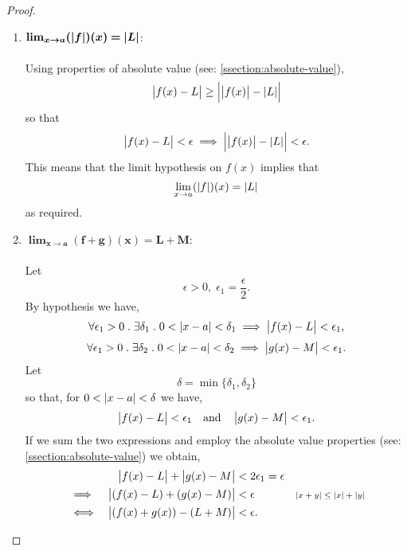 \documentclass[../MathsNotesBase.tex]{subfiles}
\begin{document}
{\begin{proof}
\begin{enumerate}[label=(\roman*)]
{					Let 
					\[ \epsilon > 0,\; \epsilon_1 = \frac{\epsilon}{\abs{c}}.\]
					By hypothesis,
					\[ \forall \epsilon_1 > 0 \logicsep \exists \delta_1 \logicsep 0 < \abs{x - a} < \delta_1 \implies \abs{f(x) - L} < \epsilon_1. \]
					Furthermore,
					\begin{align*}
					&& \abs{f(x) - L} &< \epsilon_1 \\
					&\iff & \abs{c}\abs{f(x) - L} &< \abs{c}\epsilon_1 &\sidecomment{} \\
					&\iff & \abs{cf(x) - cL} &< \abs{c}\epsilon_1 = \abs{c}\frac{\epsilon}{\abs{c}} = \epsilon. &\sidecomment{by \autoref{prop:product-of-absolute-vals-is-absolute-val-of-product}}
					\end{align*}
					\bigskip
				}
				\item{${\bm{ \lim_{x \to a} (\left\lvert f\right\rvert)(x) = \left\lvert L\right\rvert }}$:\\\\
					Using properties of absolute value (see: \ref{ssection:absolute-value}), 
					\[ \left\lvert f(x) - L\right\rvert \geq \left\lvert\left\lvert f(x)\right\rvert - \left\lvert L\right\rvert\right\rvert \]
					so that
					\[ \left\lvert f(x) - L\right\rvert < \epsilon \implies \left\lvert\left\lvert f(x)\right\rvert - \left\lvert L\right\rvert\right\rvert < \epsilon. \]
					This means that the limit hypothesis on $f(x)$ implies that
					\[ \lim_{x \to a} (\left\lvert f\right\rvert)(x) = \left\lvert L\right\rvert \]
					as required.
					\bigskip
				}
				\item{${\bm{ \lim_{x \to a} (f + g)(x) = L + M }}$:\\\\
					Let 
					\[ \epsilon > 0,\; \epsilon_1 = \frac{\epsilon}{2}.\]
					By hypothesis we have,
					\[ \forall \epsilon_1 > 0 \;.\; \exists \delta_1 \;.\; 0 < \left\lvert x - a\right\rvert < \delta_1 \implies \left\lvert f(x) - L\right\rvert < \epsilon_1, \]
					\[ \forall \epsilon_1 > 0 \;.\; \exists \delta_2 \;.\; 0 < \left\lvert x - a\right\rvert < \delta_2 \implies \left\lvert g(x) - M\right\rvert < \epsilon_1. \]
					Let 
					\[ \delta = \min \{\delta_1,\delta_2\} \]
					so that, for ${ 0 < \left\lvert x - a\right\rvert < \delta }$ we have,
					\[  \left\lvert f(x) - L\right\rvert < \epsilon_1 \hspace{10pt}\text{and}\hspace{10pt} \left\lvert g(x) - M\right\rvert < \epsilon_1. \]
					If we sum the two expressions and employ the absolute value properties (see: \ref{ssection:absolute-value}) we obtain,
					\begin{align*}
					&& \abs{f(x) - L} + \abs{g(x) - M} &<  2\epsilon_1 = \epsilon \\
					&\implies & \abs{(f(x) - L) + (g(x) - M)} &<  \epsilon &\sidecomment{${ \abs{x + y} \leq \abs{x} + \abs{y} }$} \\
					&\iff & \abs{(f(x) + g(x)) - (L + M)} &<  \epsilon. &\sidecomment{}

\end{align*}}
\end{enumerate}
\end{proof}}
\end{document}
